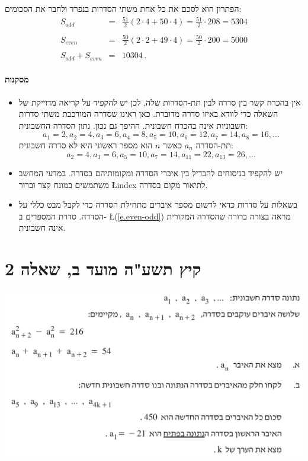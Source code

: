 \documentclass[12pt,a4paper]{article}
\begin{document}
הפתרון הוא לסכם את כל אחת משתי הסדרות בנפרד ולחבר את הסכומים:
\[
\begin{array}{lll}
S_{\mathit{odd}}&=&\frac{51}{2}(2\cdot 4 + 50\cdot 4) = \frac{51}{2}\cdot 208=5304\\
\\
S_{\mathit{even}}&=&\frac{50}{2}(2\cdot 2 + 49\cdot 4) = \frac{50}{2}\cdot 200=5000\\
\\
S_{\mathit{odd}}+S_{\mathit{even}}&=&10304\,.
\end{array}
\]

\vspace{-4ex}\paragraph{מסקנות}

\begin{itemize}
\item
אין בהכרח קשר בין סדרה לבין תת-הסדרות שלה, לכן יש להקפיד על קריאה מדוייקת של השאלה כדי לוודא באיזו סדרה מדוברת. כאן ראינו שסדרה המורכבת משתי סדרות חשבוניות אינה בהכרח חשבונית. ההיפך גם נכון. נתון הסדרה החשבונית:
\[
a_1=2, a_2=4, a_3=6, a_4=8, a_5=10, a_6=12, a_7=14, a_8=16, \ldots
\]
תת-הסדרה $a_n$ כאשר $n$ הוא מספר ראשוני היא לא סדרה חשבונית:
\[
a_2=4, a_3=6, a_5=10, a_7=14, a_{11}=22, a_{13}=26,\ldots
\]
\vspace{-4ex}
\item
 יש להקפיד בניסוחים להבדיל בין איברי הסדרה ומקומותיהם בסדרה. במדעי המחשב משתמשים במונח קצר וברור
\L{index}
לתיאור מקום בסדרה.
\item
בשאלות על סדרות כדאי לרשום מספר איברים מתחילת הסדרה כדי לקבל מבט  כללי על הסדרה. סדרת המספרים ב-
\L{(\ref{e.even-odd})}
מראה בצורה ברורה שהסדרה המקורית אינה חשבונית.
\end{itemize}

\newpage


\section*{קיץ תשע"ה מועד ב, שאלה 2}

\begin{center}
\includegraphics[width=.8\textwidth]{summer-2014b-2}
\end{center}
\end{document}
